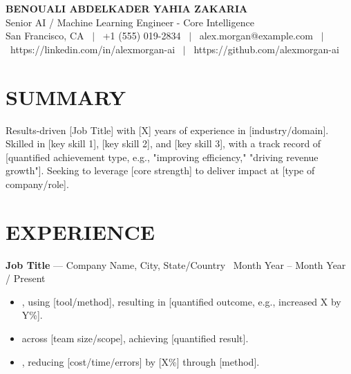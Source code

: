 \documentclass[10.5pt, letterpaper]{article}
\newcommand{\entry}[4]{%
  \noindent\textbf{#1} --- #3, #4 \textbar\ #2\par
  \vspace{2pt}
}
\newcommand{\resumeItem}[1]{\item #1}
\begin{document}
\RaggedRight

\begin{center}
  {\Huge \textbf{BENOUALI ABDELKADER YAHIA ZAKARIA}}\\[4pt]
  {\large Senior AI / Machine Learning Engineer - Core Intelligence}\\[4pt]
  San Francisco, CA \ $|$ \ +1 (555) 019-2834 \ $|$ \ alex.morgan@example.com \ $|$ \ https://linkedin.com/in/alexmorgan-ai \ $|$ \ https://github.com/alexmorgan-ai
\end{center}

\vspace{2pt}

\section{SUMMARY}
Results-driven [Job Title] with [X] years of experience in [industry/domain]. Skilled in [key skill 1], [key skill 2], and [key skill 3], with a track record of [quantified achievement type, e.g., "improving efficiency," "driving revenue growth"]. Seeking to leverage [core strength] to deliver impact at [type of company/role].

\section{EXPERIENCE}

\entry{Job Title}{Month Year -- Month Year / Present}{Company Name}{City, State/Country}
\begin{itemize}
  \resumeItem{[Action verb] [task/project], using [tool/method], resulting in [quantified outcome, e.g., increased X by Y\%].}
  \resumeItem{[Action verb] [task/project] across [team size/scope], achieving [quantified result].}
  \resumeItem{[Action verb] [task/project], reducing [cost/time/errors] by [X\%] through [method].}
\end{itemize}
\end{document}
